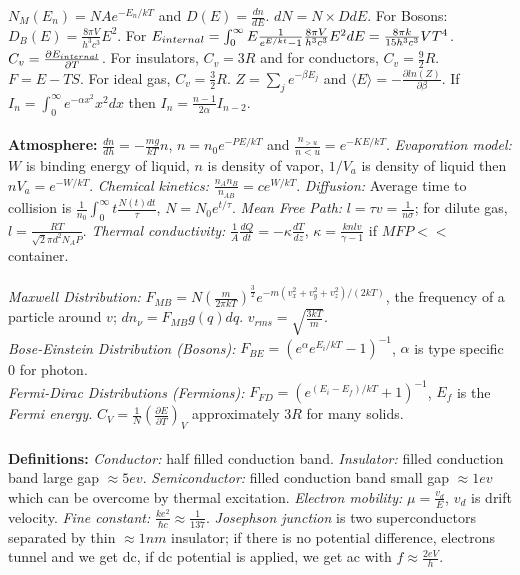 $N_M(E_n)= N A e^{-E_n / kT}$ and $D(E)= {\frac {dn} {dE}}$.  $dN = N \times D dE$.
For Bosons:
$D_B(E)= {\frac {8 \pi V} {h^3 c^3}} E^2$.  For
$E_{\small{internal}}= \int_0^{\infty} E {\frac 1 {e^{E/kt} -1}} {\frac {8 \pi V} {h^3 c^3}}
E^2 dE = {\frac {8 \pi k } {15 h^3 c^3}} V T^4$.
$C_v = {\frac {\partial E_{\small{internal}}} {\partial T}}$.
For insulators, $C_v= 3R$ and
for conductors, $C_v= {\frac 9 2}R$.  $F= E-TS$.
For ideal gas, $C_v= {\frac {3}{2}}R$.
$Z= \sum_j e^{-\beta E_j}$ and $\langle E \rangle = -{\frac {\partial ln(Z)} {\partial \beta}}$.
If $I_n= \int_{0}^{\infty} e^{-\alpha x^2} x^2 dx$ then $I_n= {\frac {n-1} {2 \alpha}} I_{n-2}$.
\\
\\
{\bf Atmosphere:}
${\frac {dn} {dh}}= -{\frac {mg} {kT}}n$, $n= n_0 e^{-PE/kT}$ and
${\frac {n_{>u}} {n<u}} = e^{-KE/kT}$.  \emph{Evaporation model:} 
$W$ is binding energy of 
liquid, $n$ is density of vapor, $1/V_a$ is density of liquid then $nV_a = e^{-W/kT}$.
\emph{Chemical kinetics:} ${\frac {n_A n_B} {n_{AB}}}= ce^{W/kT}$.  
\emph{Diffusion:} Average time to collision is 
${\frac 1 {n_0}} \int_0^{\infty} t {\frac {N(t) dt} {\tau}}$, $N=N_0 e^{t/ \tau}$.
\emph{Mean Free Path:}
$l= \tau v= {\frac 1 {n \sigma}}$; for dilute gas, 
$l= {\frac {RT}{{\sqrt 2} \pi d^2 N_A P}}$.
\emph{Thermal conductivity:} ${\frac 1 A} {\frac {dQ} {dt}} = - \kappa 
{\frac {dT} {dz}}$, $\kappa = {\frac {knlv} {\gamma-1}}$ if $MFP<<$ container.
\\
\\
\emph{Maxwell Distribution:}
$F_{MB}= N ({\frac {m} {2 \pi k T}})^{\frac 3 2} e^{-m (v_x^2+v_y^2+v_z^2)/(2kT)}$, the frequency
of a particle around $v$;  $dn_{\nu}= F_{MB} g(q) dq$.
$v_{rms}= {\sqrt {\frac {3kT} {m}}}$.
\\
\emph{Bose-Einstein Distribution (Bosons):}
$F_{BE}= (e^{\alpha} e^{E_i/kT} - 1)^{-1}$, $\alpha$ is type specific $0$ for photon.
\\
\emph{Fermi-Dirac Distributions (Fermions):}
$F_{FD}= (e^{(E_i-E_f)/kT} + 1)^{-1}$, $E_f$ is the \emph{Fermi energy}. 
$C_V= {\frac 1 N} ({\frac {\partial E} {\partial T}})_V$ approximately $3R$ for
many solids.
\\
\\
{\bf Definitions:}
\emph{Conductor:} half filled conduction band.  
\emph{Insulator:} filled conduction band large gap $\approx 5 ev$.
\emph{Semiconductor:} filled conduction band small gap $\approx 1 ev$ which can 
be overcome by thermal excitation.  
\emph{Electron mobility:} $\mu={\frac {v_d} {E}}$, $v_d$ is drift velocity.  
\emph{Fine constant:} ${\frac {ke^2} {\hbar c}} \approx {\frac 1 {137}}$.  
\emph{Josephson junction} is
two superconductors separated by thin $\approx 1 nm$ insulator; if there is no potential
difference, electrons tunnel and we get dc, if dc potential is applied, we get ac with
$f \approx {\frac {2eV}{h}}$.
